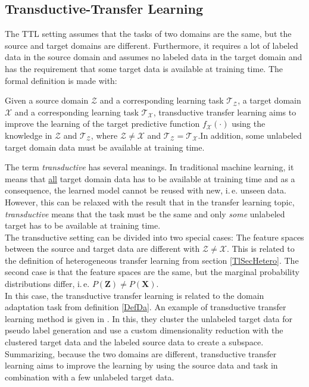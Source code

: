 \subsection{Transductive-Transfer Learning}\label{TlSubSecTrans}
The \ac{TTL} setting assumes that the tasks of two domains are the same, but the source and target domains are different.
Furthermore, it requires a lot of labeled data in the source domain and assumes no labeled data in the target domain and has the requirement that some target data is available at training time.\cite{Pan.2010}
The formal definition is made with:
\begin{mDef}\label{DefTTL}
	 Given a source domain $\mathcal{Z}$ and a corresponding learning task $\mathcal{T_Z}$, a target domain $\mathcal{X}$ and a corresponding learning task $\mathcal{T_X}$, transductive transfer learning aims to improve the learning of the target predictive function $f_\mathcal{X}(\cdot)$ using the knowledge in $\mathcal{Z}$ and $\mathcal{T_Z}$, where $\mathcal{Z} \neq \mathcal{X}$ and $\mathcal{T_Z} = \mathcal{T_X}$.In addition, some unlabeled target domain data must be available at training time.
\end{mDef}
The term \textit{transductive} has several meanings.
In traditional machine learning, it means that \underline{all} target domain data has to be available at training time and as a consequence, the learned model cannot be reused with new, i.\,e. unseen data.
However, this can be relaxed with the result that in the transfer learning topic, \textit{transductive} means that the task must be the same and only \textit{some} unlabeled target has to be available at training time.\cite{Pan.2010}\\
The transductive setting can be divided into two special cases:
The feature spaces between the source and target data are different with $\mathcal{Z} \neq \mathcal{X}$.
This is related to the definition of heterogeneous transfer learning from section \ref{TlSecHetero}.
The second case is that the feature spaces are the same, but the marginal probability distributions differ, i.\,e. $P(\mathbf{Z}) \neq P(\mathbf{X})$.\cite{Pan.2010}\\
In this case, the transductive transfer learning is related to the domain adaptation task from definition \ref{DefDa}.
An example of transductive transfer learning method is given in \cite{Wang.2008}.
In this, they cluster the unlabeled target data for pseudo label generation and use a custom dimensionality reduction with the clustered target data and the labeled source data to create a subspace.
Summarizing, because the two domains are different, transductive transfer learning aims to improve the learning by using the source data and task in combination with a few unlabeled target data.

